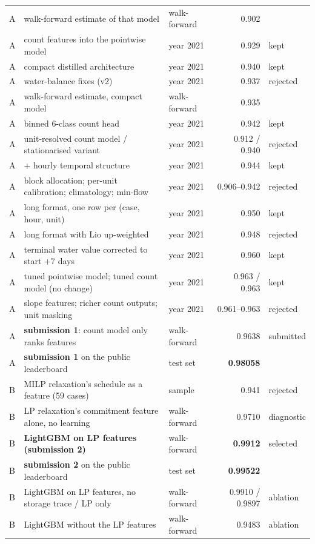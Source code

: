 \documentclass[11pt]{article}
\newcommand{\kagglelp}{0.99522}                        %
\begin{document}
\begin{table}[H]
\begin{tabularx}{\linewidth}{lYlrl}
A & walk-forward estimate of that model & walk-forward & 0.902 & \\
A & count features into the pointwise model & year 2021 & 0.929 & kept \\
A & compact distilled architecture & year 2021 & 0.940 & kept \\
A & water-balance fixes (v2) & year 2021 & 0.937 & rejected \\
A & walk-forward estimate, compact model & walk-forward & 0.935 & \\
A & binned 6-class count head & year 2021 & 0.942 & kept \\
A & unit-resolved count model / stationarised variant & year 2021 & 0.912 / 0.940 & rejected \\
A & + hourly temporal structure & year 2021 & 0.944 & kept \\
A & block allocation; per-unit calibration; climatology; min-flow & year 2021 & 0.906--0.942 & rejected \\
A & long format, one row per (case, hour, unit) & year 2021 & 0.950 & kept \\
A & long format with Lio up-weighted & year 2021 & 0.948 & rejected \\
A & terminal water value corrected to start $+7$ days & year 2021 & 0.960 & kept \\
A & tuned pointwise model; tuned count model (no change) & year 2021 & 0.963 / 0.963 & kept \\
A & slope features; richer count outputs; unit masking & year 2021 & 0.961--0.963 & rejected \\
A & \textbf{submission 1}: count model only ranks features & walk-forward & 0.9638 & submitted \\
A & \textbf{submission 1} on the public leaderboard & test set & \textbf{0.98058} & \\
B & MILP relaxation's schedule as a feature (59 cases) & sample & 0.941 & rejected \\
B & LP relaxation's commitment feature alone, no learning & walk-forward & 0.9710 & diagnostic \\
B & \textbf{LightGBM on LP features (submission 2)} & walk-forward & \textbf{0.9912} & selected \\
B & \textbf{submission 2} on the public leaderboard & test set & \textbf{\kagglelp{}} & \\
B & LightGBM on LP features, no storage trace / LP only & walk-forward & 0.9910 / 0.9897 & ablation \\
B & LightGBM without the LP features & walk-forward & 0.9483 & ablation \\

\end{tabularx}
\end{table}
\end{document}
